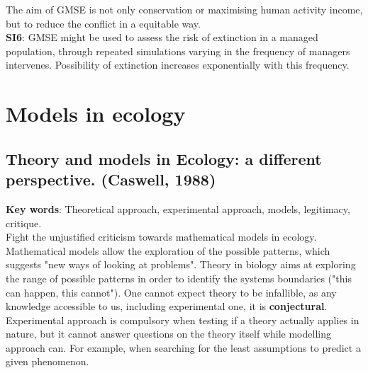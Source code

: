 \documentclass[12pt]{article}
\begin{document}
The aim of GMSE is not only conservation or maximising human activity income, but to reduce the conflict in a equitable way.\\

\textbf{SI6}: GMSE  might  be  used  to  assess  the  risk  of  extinction  in  a  managed  population, through repeated simulations varying in the frequency of managers intervenes. Possibility of extinction increases exponentially with this frequency.

\section{Models in ecology}

\subsection{Theory and models in Ecology: a different perspective. (Caswell, 1988)}
\textbf{Key words}: Theoretical approach, experimental approach, models, legitimacy, critique.\\

Fight the unjustified criticism towards mathematical models in ecology.
Mathematical models allow the exploration of the possible patterns, which suggests "new ways of looking at problems".
Theory in biology aims at exploring the range of possible patterns in order to identify the systems boundaries ("this can happen, this cannot").
One cannot expect theory to be infallible, as any knowledge accessible to us, including experimental one, it is \textbf{conjectural}. 
Experimental approach is compulsory when testing if a theory actually applies in nature, but it cannot answer questions on the theory itself while modelling approach can. For example, when searching for the least assumptions to predict a given phenomenon.
\end{document}
